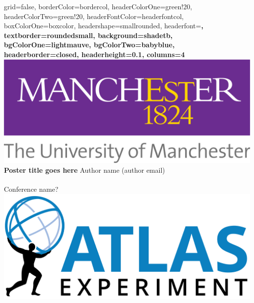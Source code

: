 \documentclass[a1paper,portrait,10pt]{baposter}
\begin{document}
\begin{poster}{
grid=false,
borderColor=bordercol, %
headerColorOne=green!20, %
headerColorTwo=green!20, %
headerFontColor=headerfontcol, %
boxColorOne=boxcolor, %
headershape=smallrounded, %
headerfont=\Large\sf\bf, %
textborder=roundedsmall,
background=shadetb,
bgColorOne=lightmauve,
bgColorTwo=babyblue,
headerborder=closed, %
headerheight=0.1\textheight,
columns=4
}
{\includegraphics[scale=0.1]{Manc.png}} %
%
%
{ \bf  \huge {Poster title goes here} } %
{\smaller Author name (author email)  \\  
 \\
 {Conference name?}}
{\includegraphics[scale=0.2]{ATLAS_logo.png}}



\end{poster}
\end{document}
